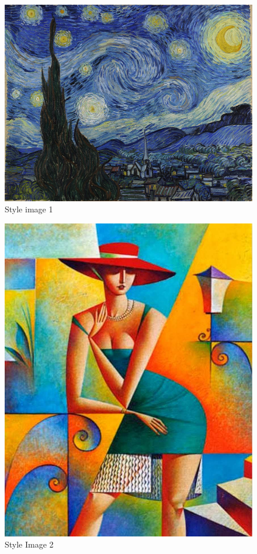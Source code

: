\documentclass[a4paper, 11pt]{article}
\begin{document}
				\begin{figure}[htb!]
					\begin{minipage}{1\textwidth}
						\centering
						\includegraphics[scale=.2]{../data/style_vangogh}
						\caption{Style image 1}
					\end{minipage}\hfill
				\end{figure}
				
				\begin{figure}[htb!]
					\begin{minipage}{1\textwidth}
						\centering
						\includegraphics[scale=.2]{../data/style_mujer}
						\caption{Style Image 2}
					\end{minipage}\hfill
				\end{figure}
			
\end{document}
